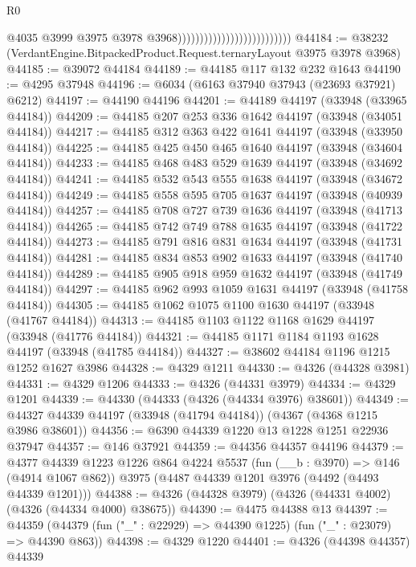 \begin{lexlean}{R0}
\begin{coremodule}
                                                        @4035
                                                        @3999
                                                        @3975
                                                        @3978
                                                        @3968))))))))))))))))))))))))))
@44184 := @38232 (VerdantEngine.BitpackedProduct.Request.ternaryLayout @3975 @3978 @3968)
@44185 := @39072 @44184
@44189 := @44185 @117 @132 @232 @1643
@44190 := @4295 @37948
@44196 := @6034 (@6163 @37940 @37943 (@23693 @37921) @6212)
@44197 := @44190 @44196
@44201 := @44189 @44197 (@33948 (@33965 @44184))
@44209 := @44185 @207 @253 @336 @1642 @44197 (@33948 (@34051 @44184))
@44217 := @44185 @312 @363 @422 @1641 @44197 (@33948 (@33950 @44184))
@44225 := @44185 @425 @450 @465 @1640 @44197 (@33948 (@34604 @44184))
@44233 := @44185 @468 @483 @529 @1639 @44197 (@33948 (@34692 @44184))
@44241 := @44185 @532 @543 @555 @1638 @44197 (@33948 (@34672 @44184))
@44249 := @44185 @558 @595 @705 @1637 @44197 (@33948 (@40939 @44184))
@44257 := @44185 @708 @727 @739 @1636 @44197 (@33948 (@41713 @44184))
@44265 := @44185 @742 @749 @788 @1635 @44197 (@33948 (@41722 @44184))
@44273 := @44185 @791 @816 @831 @1634 @44197 (@33948 (@41731 @44184))
@44281 := @44185 @834 @853 @902 @1633 @44197 (@33948 (@41740 @44184))
@44289 := @44185 @905 @918 @959 @1632 @44197 (@33948 (@41749 @44184))
@44297 := @44185 @962 @993 @1059 @1631 @44197 (@33948 (@41758 @44184))
@44305 := @44185 @1062 @1075 @1100 @1630 @44197 (@33948 (@41767 @44184))
@44313 := @44185 @1103 @1122 @1168 @1629 @44197 (@33948 (@41776 @44184))
@44321 := @44185 @1171 @1184 @1193 @1628 @44197 (@33948 (@41785 @44184))
@44327 := @38602 @44184 @1196 @1215 @1252 @1627 @3986
@44328 := @4329 @1211
@44330 := @4326 (@44328 @3981)
@44331 := @4329 @1206
@44333 := @4326 (@44331 @3979)
@44334 := @4329 @1201
@44339 := @44330 (@44333 (@4326 (@44334 @3976) @38601))
@44349 := @44327 @44339 @44197 (@33948 (@41794 @44184)) (@4367 (@4368 @1215 @3986 @38601))
@44356 := @6390 @44339 @1220 @13 @1228 @1251 @22936 @37947
@44357 := @146 @37921
@44359 := @44356 @44357 @44196
@44379 := @4377
    @44339
    @1223
    @1226
    @864
    @4224
    @5537
    (fun (__b : @3970) => @146 (@4914 @1067 @862))
    @3975
    (@4487 @44339 @1201 @3976 (@4492 (@4493 @44339 @1201)))
@44388 := @4326 (@44328 @3979) (@4326 (@44331 @4002) (@4326 (@44334 @4000) @38675))
@44390 := @4475 @44388 @13
@44397 := @44359 (@44379 (fun ("_" : @22929) => @44390 @1225) (fun ("_" : @23079) => @44390 @863))
@44398 := @4329 @1220
@44401 := @4326 (@44398 @44357) @44339

\end{coremodule}
\end{lexlean}
